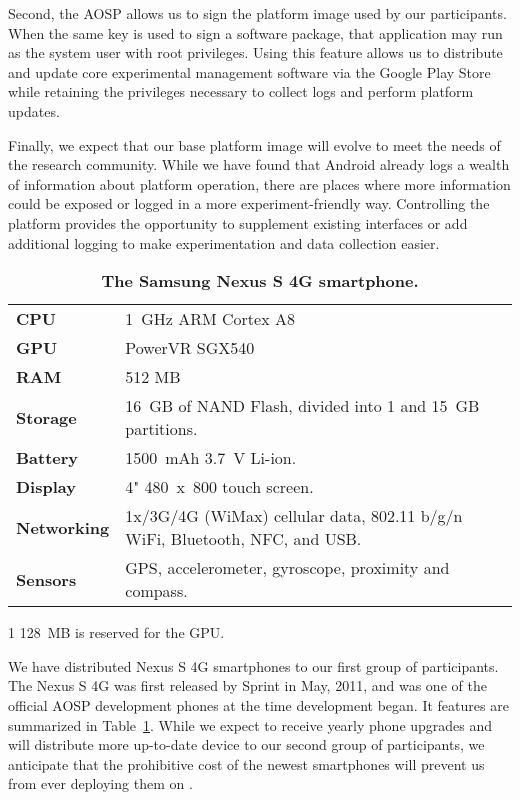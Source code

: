 Second, the AOSP allows us to sign the platform image used by our
participants. When the same key is used to sign a software package, that
application may run as the system user with root privileges. Using this
feature allows us to distribute and update core \PhoneLab{} experimental
management software via the Google Play Store while retaining the privileges
necessary to collect logs and perform platform updates.

Finally, we expect that our base \PhoneLab{} platform image will evolve to
meet the needs of the research community. While we have found that Android
already logs a wealth of information about platform operation, there are
places where more information could be exposed or logged in a more
experiment-friendly way. Controlling the platform provides the opportunity to
supplement existing interfaces or add additional logging to make
experimentation and data collection easier.

\begin{table}[t]
\begin{threeparttable}
\begin{tabularx}{\columnwidth}{lX}
\toprule
\textbf{CPU} & 1~GHz ARM Cortex A8 \\
\textbf{GPU} & PowerVR SGX540 \\
\textbf{RAM} & 512 MB\tnote{1} \\
\textbf{Storage} & 16~GB of NAND Flash, divided into 1 and 15~GB partitions.\\
\textbf{Battery} & \num{1500}~mAh 3.7~V Li-ion.\\
\textbf{Display} & 4" 480~x~800 touch screen.\\
\textbf{Networking} & 1x/3G/4G (WiMax) cellular data, 802.11 b/g/n WiFi,
Bluetooth, NFC, and USB.\\
\textbf{Sensors} & GPS, accelerometer, gyroscope, proximity and compass.\\
\bottomrule
\end{tabularx}

{\footnotesize
\begin{tablenotes}
\item [1] 128~MB is reserved for the GPU.
\end{tablenotes}}

\caption{\textbf{The Samsung Nexus S 4G smartphone.}}
\label{table-nexuss4g}
\end{threeparttable}
\end{table}

We have distributed Nexus S 4G smartphones to our first group of
participants. The Nexus S 4G was first released by Sprint in May, 2011, and
was one of the official AOSP development phones at the time \PhoneLab{}
development began. It features are summarized in Table~\ref{table-nexuss4g}.
While we expect to receive yearly phone upgrades and will distribute more
up-to-date device to our second group of participants, we anticipate that the
prohibitive cost of the newest smartphones will prevent us from ever
deploying them on \PhoneLab{}.

